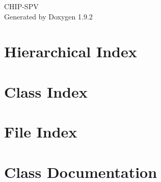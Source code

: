 \documentclass[twoside]{book}
\newcommand{\+}{\discretionary{\mbox{\scriptsize$\hookleftarrow$}}{}{}}
\newcommand{\clearemptydoublepage}{%
    \newpage{\pagestyle{empty}\cleardoublepage}%
  }
\begin{document}
  \raggedbottom
    \hypersetup{pageanchor=false,
                bookmarksnumbered=true,
                pdfencoding=unicode
               }
  \begin{titlepage}
  \vspace*{7cm}
  \begin{center}%
  {\Large CHIP-\/\+SPV}\\
  \vspace*{1cm}
  {\large Generated by Doxygen 1.9.2}\\
  \end{center}
  \end{titlepage}
  \clearemptydoublepage
  \tableofcontents
  \clearemptydoublepage
  \hypersetup{pageanchor=true}
\chapter{Hierarchical Index}

\chapter{Class Index}

\chapter{File Index}

\chapter{Class Documentation}













































\end{document}
